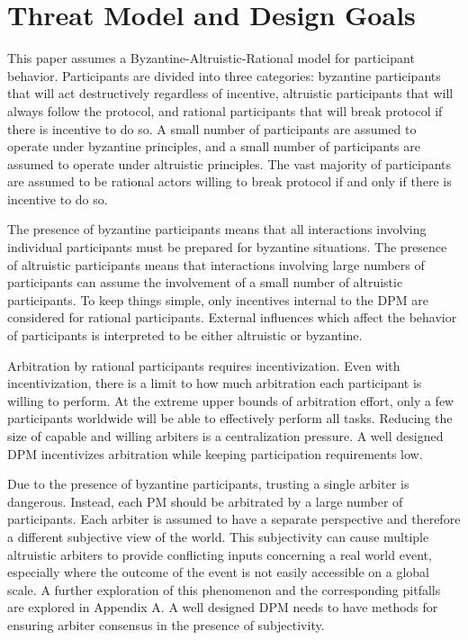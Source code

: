 \documentclass[onecolumn]{article}
\begin{document}
\section{Threat Model and Design Goals}
This paper assumes a Byzantine-Altruistic-Rational model \cite{bar} for participant behavior.
Participants are divided into three categories:
byzantine participants that will act destructively regardless of incentive, altruistic participants that will always follow the protocol, and rational participants that will break protocol if there is incentive to do so.
A small number of participants are assumed to operate under byzantine principles, and a small number of participants are assumed to operate under altruistic principles.
The vast majority of participants are assumed to be rational actors willing to break protocol if and only if there is incentive to do so.

The presence of byzantine participants means that all interactions involving individual participants must be prepared for byzantine situations.
The presence of altruistic participants means that interactions involving large numbers of participants can assume the involvement of a small number of altruistic participants.
To keep things simple, only incentives internal to the DPM are considered for rational participants.
External influences which affect the behavior of participants is interpreted to be either altruistic or byzantine.

Arbitration by rational participants requires incentivization.
Even with incentivization, there is a limit to how much arbitration each participant is willing to perform.
At the extreme upper bounds of arbitration effort, only a few participants worldwide will be able to effectively perform all tasks.
Reducing the size of capable and willing arbiters is a centralization pressure.
A well designed DPM incentivizes arbitration while keeping participation requirements low.

Due to the presence of byzantine participants, trusting a single arbiter is dangerous.
Instead, each PM should be arbitrated by a large number of participants.
Each arbiter is assumed to have a separate perspective and therefore a different subjective view of the world.
This subjectivity can cause multiple altruistic arbiters to provide conflicting inputs concerning a real world event, especially where the outcome of the event is not easily accessible on a global scale.
A further exploration of this phenomenon and the corresponding pitfalls are explored in Appendix A.
A well designed DPM needs to have methods for ensuring arbiter consensus in the presence of subjectivity.
\end{document}
